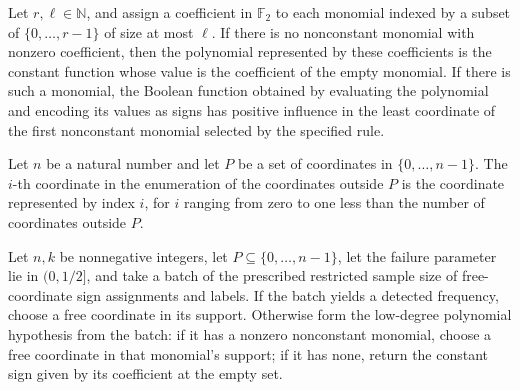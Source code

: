 \begin{theorem}
\label{FABL.firstNonconstantLowDegreeMonomial_sound}
\leanok
{}
Let $r,\ell\in\mathbb{N}$, and assign a coefficient in $\mathbb{F}_2$ to each monomial
indexed by a subset of $\{0,\ldots,r-1\}$ of size at most $\ell$. If there is no
nonconstant monomial with nonzero coefficient, then the polynomial represented by these
coefficients is the constant function whose value is the coefficient of the empty
monomial. If there is such a monomial, the Boolean function obtained by evaluating the
polynomial and encoding its values as signs has positive influence in the least
coordinate of the first nonconstant monomial selected by the specified rule.
\end{theorem}

\begin{definition}
\label{FABL.juntaFreeCoordinateOfFin}
\leanok
{}
Let $n$ be a natural number and let $P$ be a set of coordinates in $\{0,\ldots,n-1\}$.
The $i$-th coordinate in the enumeration of the coordinates outside $P$ is the
coordinate represented by index $i$, for $i$ ranging from zero to one less than the
number of coordinates outside $P$.
\end{definition}

\begin{definition}
\label{FABL.lowDegreeJuntaNodeDecisionFromBatch}
\leanok
{}
Let $n,k$ be nonnegative integers, let $P\subseteq\{0,\ldots,n-1\}$, let the failure
parameter lie in $(0,1/2]$, and take a batch of the prescribed restricted sample size of
free-coordinate sign assignments and labels. If the batch yields a detected frequency,
choose a free coordinate in its support. Otherwise form the low-degree polynomial
hypothesis from the batch: if it has a nonzero nonconstant monomial, choose a free
coordinate in that monomial's support; if it has none, return the constant sign given by
its coefficient at the empty set.
\end{definition}

